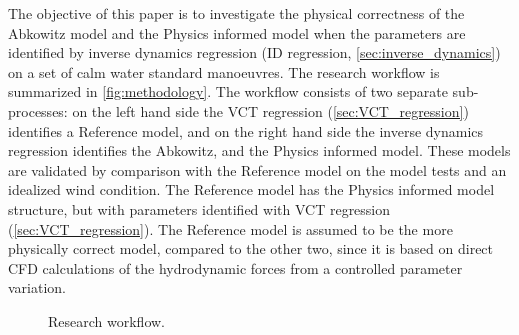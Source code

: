 The objective of this paper is to investigate the physical correctness of the Abkowitz model and the Physics informed model when the parameters are identified by inverse dynamics regression (ID regression, \autoref{sec:inverse_dynamics}) on a set of calm water standard manoeuvres. 
%
The research workflow is summarized in \autoref{fig:methodology}. The workflow consists of two separate sub-processes: on the left hand side the VCT regression (\autoref{sec:VCT_regression}) identifies a Reference model, and on the right hand side the inverse dynamics regression identifies the Abkowitz, and the Physics informed model.
These models are validated by comparison with the Reference model on the model tests and an idealized wind condition.
The Reference model has the Physics informed model structure, but with parameters identified with VCT regression (\autoref{sec:VCT_regression}). 
The Reference model is assumed to be the more physically correct model, compared to the other two, since it is based on direct CFD calculations of the hydrodynamic forces from a controlled parameter variation.
%
\begin{figure}[h]
    \centering
    
    \caption{Research workflow.}
    \label{fig:methodology}
\end{figure}
%
